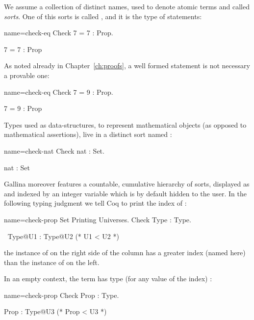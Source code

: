 We assume a collection of distinct names, used to denote atomic terms
and called \emph{sorts}.  One of this sorts is called , and it
is the type of statements:

\begin{coq-left}{name=check-eq}{}
Check 7 = 7 : Prop.
\end{coq-left}
\begin{coqout-right}
7 = 7 : Prop
\end{coqout-right}

As noted already in Chapter~\ref{ch:proofs}, a well formed statement
is not necessary a provable one:

\begin{coq-left}{name=check-eq}{}
Check 7 = 9 : Prop.
\end{coq-left}
\begin{coqout-right}
7 = 9 : Prop
\end{coqout-right}

Types used as data-structures, to represent mathematical objects (as
opposed to mathematical assertions), live in a distinct sort named
:

\begin{coq-left}{name=check-nat}{}
Check nat : Set.
\end{coq-left}
\begin{coqout-right}
nat : Set
\end{coqout-right}

Gallina moreover features a countable, cumulative hierarchy of sorts,
displayed as  and indexed by an integer variable which is by
default hidden to the user.  In the following typing judgment we tell Coq
to print the index of :

\begin{coq-left}{name=check-prop}{}
Set Printing Universes.
Check Type : Type.
\end{coq-left}
\begin{coqout-right}
$~$
Type@{U1} : Type@{U2} (* U1 < U2 *)
\end{coqout-right}

the instance of  on the right side of the column has a greater
index (named  here) than the instance of  on the left.

In an empty context,
the term  has type  (for any value of the index) :

\begin{coq-left}{name=check-prop}{}
Check Prop : Type.
\end{coq-left}
\begin{coqout-right}
Prop : Type@{U3} (* Prop < U3 *)
\end{coqout-right}


